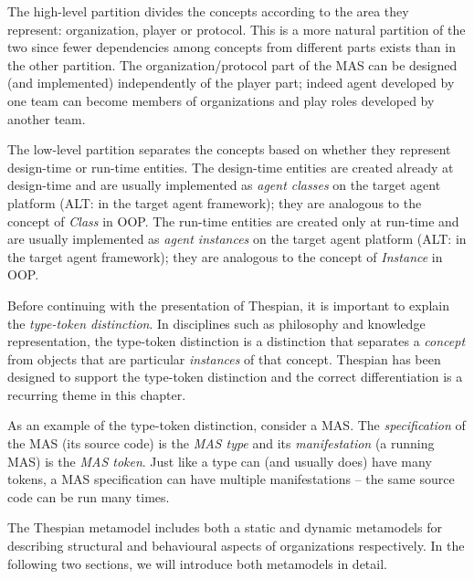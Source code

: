 The high-level partition divides the concepts according to the area they represent: organization, player or protocol.
This is a more natural partition of the two since fewer dependencies among concepts from different parts exists than in the other partition.
The organization/protocol part of the MAS can be designed (and implemented) independently of the player part; indeed agent developed by one team can become members of organizations and play roles developed by another team. 

The low-level partition separates the concepts based on whether they represent design-time or run-time entities.
The design-time entities are created already at design-time and are usually implemented as \textit{agent classes} on the target agent platform (ALT: in the target agent framework); they are analogous to the concept of \textit{Class} in OOP.
The run-time entities are created only at run-time and are usually implemented as \textit{agent instances} on the target agent platform (ALT: in the target agent framework); they are analogous to the concept of \textit{Instance} in OOP.

Before continuing with the presentation of Thespian, it is important to explain the \textit{type-token distinction}.
In disciplines such as philosophy and knowledge representation, the type-token distinction is a distinction that separates a \textit{concept} from objects that are particular \textit{instances} of that concept.
Thespian has been designed to support the type-token distinction and the correct differentiation is a recurring theme in this chapter.

As an example of the type-token distinction, consider a MAS.
The \textit{specification} of the MAS (its source code) is the \textit{MAS type} and its \textit{manifestation} (a running MAS) is the \textit{MAS token}.
Just like a type can (and usually does) have many tokens, a MAS specification can have multiple manifestations -- the same source code can be run many times.

The Thespian metamodel includes both a static and dynamic metamodels for describing structural and behavioural aspects of organizations respectively.
In the following two sections, we will introduce both metamodels in detail.



